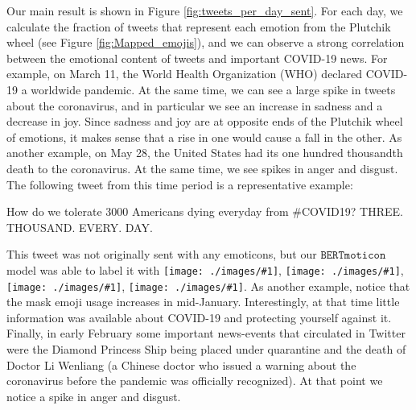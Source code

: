 \documentclass[11pt]{article}
\newcommand{\bertmoji}{\texttt{BERTmoticon}}
\newcommand{\emoji}[1]{\texttt{[image: ./images/\#1]}}
\DeclareMathOperator{\emoticon}{\texttt{TwitterEmoticon}}
\DeclareMathOperator{\corona}{\texttt{TwitterCOVID}}
\begin{document}
Our main result is shown in Figure \ref{fig:tweets_per_day_sent}.
For each day, we calculate the fraction of tweets that represent each emotion from the Plutchik wheel (see Figure \ref{fig:Mapped_emojis}),
and we can observe a strong correlation between the emotional content of tweets and important COVID-19 news.
For example, on March 11, the World Health Organization (WHO) declared COVID-19 a worldwide pandemic.
At the same time, we can see a large spike in tweets about the coronavirus,
and in particular we see an increase in sadness and a decrease in joy.
Since sadness and joy are at opposite ends of the Plutchik wheel of emotions,
it makes sense that a rise in one would cause a fall in the other.
As another example, on May 28, the United States had its one hundred thousandth death to the coronavirus.
At the same time, we see spikes in anger and disgust.
The following tweet from this time period is a representative example:
\begin{displayquote}
    How do we tolerate 3000 Americans dying everyday from \#COVID19? THREE. THOUSAND. EVERY. DAY.
\end{displayquote}
This tweet was not originally sent with any emoticons,
but our $\bertmoji$ model was able to label it with \emoji{1f620}, \emoji{mask_photo}, \emoji{1f644}, \emoji{1f62d}.
As another example, notice that the mask emoji usage increases in mid-January.
Interestingly, at that time little information was available about COVID-19 and protecting yourself against it.
Finally, in early February some important news-events that circulated in Twitter were the Diamond Princess Ship being placed under quarantine and the death of Doctor Li Wenliang
(a Chinese doctor who issued a warning about the coronavirus before the pandemic was officially recognized).
At that point we notice a spike in anger and disgust.

\end{document}
